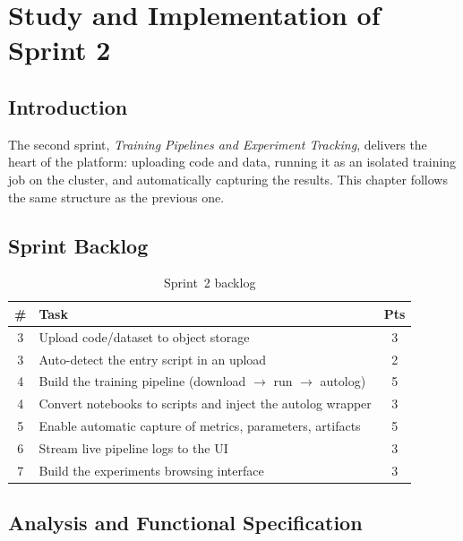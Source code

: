 \chapter{Study and Implementation of Sprint 2}
\label{chap:sprint2}

\section*{Introduction}
The second sprint, \emph{Training Pipelines and Experiment Tracking}, delivers the
heart of the platform: uploading code and data, running it as an isolated training
job on the cluster, and automatically capturing the results. This chapter follows
the same structure as the previous one.

\section{Sprint Backlog}
\begin{table}[H]\centering
\renewcommand{\arraystretch}{1.25}
\caption{Sprint~2 backlog}\label{tab:backlog-s2}
\begin{tabularx}{\textwidth}{|c|X|c|}
\hline
\textbf{\#} & \textbf{Task} & \textbf{Pts}\\
\hline
3 & Upload code/dataset to object storage & 3\\ \hline
3 & Auto-detect the entry script in an upload & 2\\ \hline
4 & Build the training pipeline (download $\to$ run $\to$ autolog) & 5\\ \hline
4 & Convert notebooks to scripts and inject the autolog wrapper & 3\\ \hline
5 & Enable automatic capture of metrics, parameters, artifacts & 5\\ \hline
6 & Stream live pipeline logs to the UI & 3\\ \hline
7 & Build the experiments browsing interface & 3\\ \hline
\end{tabularx}
\end{table}

\section{Analysis and Functional Specification}

